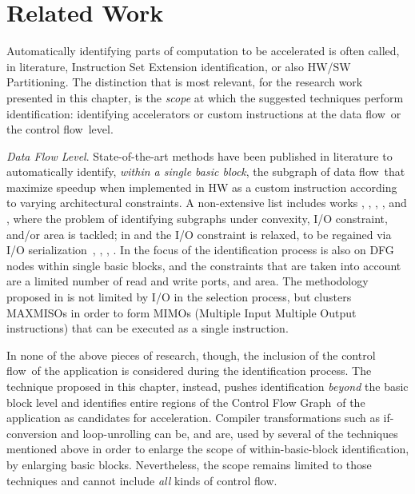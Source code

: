 \documentclass[]{usiinfthesis}
\newcommand{\dataflow}{data flow}
\newcommand{\controlflow}{control flow}
\newcommand{\CFG}{Control Flow Graph}
\begin{document}
\section{Related Work}
\label{sec:rw}

Automatically identifying parts of computation to be
accelerated is often called, in literature, Instruction Set Extension
identification, or also HW/SW Partitioning. The distinction that is most 
relevant, for the research work presented in this chapter, is the
\emph{scope} at which the suggested techniques perform identification: 
identifying accelerators or custom instructions at the \dataflow\ or
the \controlflow\ level.\par

\emph{Data Flow Level}.
State-of-the-art methods have been
published in literature to automatically identify,
\emph{within a single basic block}, the subgraph of \dataflow\  
that maximize speedup when implemented in HW as a custom instruction
according to varying architectural constraints. A non-extensive list
includes works \cite{BonziniJul07b} \cite{ChenFeb07}, \cite{GiaquintaMar15}, 
\cite{MartiFeb12}, \cite{PozziJul06}, \cite{ReddingtonAug09} and \cite{YuSep04}, where the 
problem of identifying subgraphs under convexity, I/O
constraint, and/or area is tackled; in \cite{PothineniJan07} and 
\cite{VermaOct07} the I/O constraint is relaxed, to be regained
via I/O serialization~\cite{AhnJan13}, \cite{AtasuApr07}, 
\cite{PozziSep05}, \cite{VermaOct07}. In \cite{CongFeb04} the focus of
the identification process is also on DFG nodes within single basic
blocks, and the constraints that are taken into account are a limited
number of read and write ports, and area.  The methodology proposed in
\cite{GaluzziOct06} is not limited by I/O in the selection process,
but clusters MAXMISOs \cite{AlippiMar99} in order to form MIMOs 
(Multiple Input Multiple Output instructions) that can be executed as 
a single instruction.\par

In none of the above pieces of research, though, the inclusion of the
\controlflow\ of the application is considered during the
identification process. The technique proposed in this chapter, 
instead, pushes 
identification \emph{beyond} the basic block level and identifies 
entire regions of the \CFG\ of the
application as candidates for acceleration. Compiler
transformations such as if-conversion and loop-unrolling can be, and
are, used by several of the techniques mentioned above in order to
enlarge the scope of within-basic-block identification, by enlarging 
basic blocks. Nevertheless, the scope remains limited to those
techniques and cannot include \emph{all} kinds of
\controlflow.\par
\end{document}
